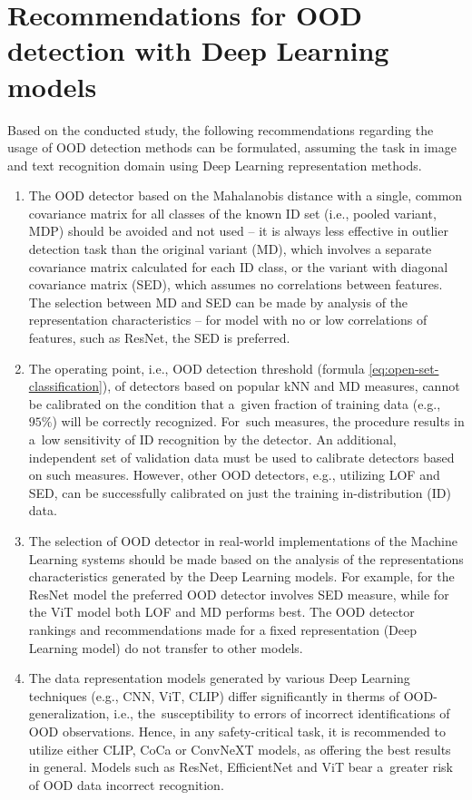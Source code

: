 \section{Recommendations for OOD detection with Deep Learning models}
\label{section:real-recommendations}

Based on the conducted study, the following recommendations regarding the usage of OOD detection methods can be formulated, assuming the task in image and text recognition domain using Deep Learning representation methods.
\vspace{-0.5\baselineskip}
\begin{enumerate}
    \item The OOD detector based on the Mahalanobis distance with a single, common covariance matrix for all classes of the known ID set (i.e., pooled variant, MDP) should be avoided and not used – it is always less effective in outlier detection task than the original variant (MD), which involves a separate covariance matrix calculated for each ID class, or the variant with diagonal covariance matrix (SED), which assumes no correlations between features. The selection between MD and SED can be made by analysis of the representation characteristics – for model with no or low correlations of features, such as ResNet, the SED is preferred.
    \item The operating point, i.e., OOD detection threshold (formula \ref{eq:open-set-classification}), of detectors based on popular kNN and MD measures, cannot be calibrated on the condition that a~given fraction of training data (e.g., $95\%$) will be correctly recognized. For~such measures, the procedure results in a~low sensitivity of ID recognition by the detector. An additional, independent set of validation data must be used to calibrate detectors based on such measures. However, other OOD detectors, e.g., utilizing LOF and SED, can be successfully calibrated on just the training in-distribution (ID) data.
    \item The selection of OOD detector in real-world implementations of the Machine Learning systems should be made based on the analysis of the representations characteristics generated by the Deep Learning models. For example, for the ResNet model the preferred OOD detector involves SED measure, while for the ViT model both LOF and MD performs best. The OOD detector rankings and recommendations made for a fixed representation (Deep Learning model) do not transfer to other models.
    \item The data representation models generated by various Deep Learning techniques (e.g., CNN, ViT, CLIP) differ significantly in therms of OOD-generalization, i.e., the~susceptibility to errors of incorrect identifications of OOD observations. Hence, in any safety-critical task, it is recommended to utilize either CLIP, CoCa or ConvNeXT models, as offering the best results in general. Models such as ResNet, EfficientNet and ViT bear a~greater risk of OOD data incorrect recognition.

\end{enumerate}
